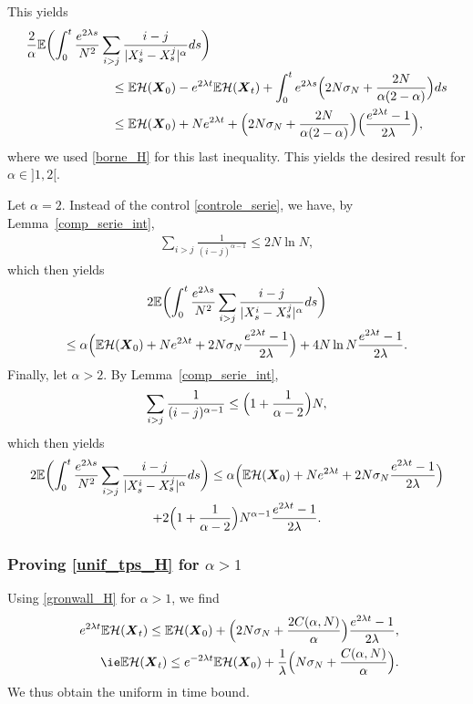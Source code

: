 \documentclass[JEP,XML,SOM,Unicode,published]{cedram}
\newcommand{\bX}{{\boldsymbol{X}}}
\theoremstyle{plain}
\theoremstyle{definition}
\begin{document}
This yields
\begin{align*}
\frac{2}{\alpha}\mathbb{E}\biggl(\int_0^t\frac{e^{2\lambda s}}{N^2}&\sum_{i>j}\frac{i-j}{|X^i_s-X^j_s|^{\alpha}}ds\biggr)\\
&\hspace{0.3cm}\leq\mathbb{E}\mathcal{H}(\bX_0)-e^{2\lambda t}\mathbb{E}\mathcal{H}(\bX_t)+\int_0^te^{2\lambda s}\Bigl(2N\sigma_N+\frac{2N}{\alpha(2-\alpha)}\Bigr)ds\\
&\hspace{0.3cm}\leq\mathbb{E}\mathcal{H}(\bX_0)+Ne^{2\lambda t}+\Bigl(2N\sigma_N+\frac{2N}{\alpha(2-\alpha)}\Bigr)\Bigl(\frac{e^{2\lambda t}-1}{2\lambda}\Bigr),
\end{align*}
where we used \eqref{borne_H} for this last inequality.
This yields the desired result for $\alpha\in{}]1,2[$.

Let $\alpha=2$. Instead of the control \eqref{controle_serie}, we have, by Lemma~\ref{comp_serie_int},
\begin{align*}
\sum_{i>j}\frac{1}{(i-j)^{\alpha-1}}\leq 2N\ln N,
\end{align*}
which then yields
\begin{multline*}
2\mathbb{E}\biggl(\int_0^t\frac{e^{2\lambda s}}{N^2}\sum_{i>j}\frac{i-j}{|X^i_s-X^j_s|^{\alpha}}ds\biggr)
\\
\leq \alpha\Bigl(\mathbb{E}\mathcal{H}(\bX_0)+Ne^{2\lambda t}+2N\sigma_N \frac{e^{2\lambda t}-1}{2\lambda}\Bigr)+4N\ln N\frac{e^{2\lambda t}-1}{2\lambda}.\\
\end{multline*}
Finally, let $\alpha>2$. By Lemma~\ref{comp_serie_int},
\begin{align*}
\sum_{i>j}\frac{1}{(i-j)^{\alpha-1}}\leq \Bigl(1+\frac{1}{\alpha-2}\Bigr)N,
\end{align*}
which then yields
\begin{multline*}
2\mathbb{E}\biggl(\int_0^t\frac{e^{2\lambda s}}{N^2}\sum_{i>j}\frac{i-j}{|X^i_s-X^j_s|^{\alpha}}ds\biggr)\leq\alpha\Bigl(\mathbb{E}\mathcal{H}(\bX_0)+Ne^{2\lambda t}+2N\sigma_N \frac{e^{2\lambda t}-1}{2\lambda}\Bigr)\\
+2\Bigl(1+\frac{1}{\alpha-2}\Bigr)N^{\alpha-1}\frac{e^{2\lambda t}-1}{2\lambda}.
\end{multline*}

\subsubsection*{Proving \eqref{unif_tps_H} for $\alpha>1$} Using \eqref{gronwall_H} for $\alpha>1$, we find
\begin{align*}
e^{2\lambda t}\mathbb{E}\mathcal{H}(\bX_t)\leq\mathbb{E}\mathcal{H}(\bX_0)+\Bigl(2N\sigma_N+\frac{2C(\alpha,N)}{\alpha}\Bigr)\frac{e^{2\lambda t}-1}{2\lambda },
\\
\tag*{\ie}
\mathbb{E}\mathcal{H}(\bX_t)\leq e^{-2\lambda t}\mathbb{E}\mathcal{H}(\bX_0)+\frac{1}{\lambda }\Bigl(N\sigma_N+\frac{C(\alpha,N)}{\alpha}\Bigr).
\end{align*}
We thus obtain the uniform in time bound.
\end{document}
